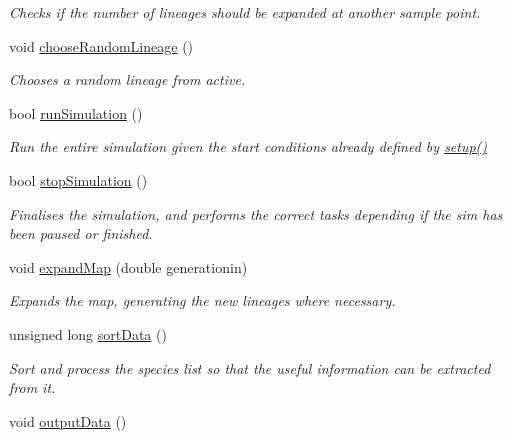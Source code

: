 \begin{DoxyCompactItemize}
\begin{DoxyCompactList}\small\item\em Checks if the number of lineages should be expanded at another sample point. \end{DoxyCompactList}\item 
void \hyperlink{class_tree_a23803bddf46ad28a1bdd46bf05693b1f}{choose\+Random\+Lineage} ()
\begin{DoxyCompactList}\small\item\em Chooses a random lineage from active. \end{DoxyCompactList}\item 
bool \hyperlink{class_tree_afe75245862a1c40030c1c8607518cf8d}{run\+Simulation} ()
\begin{DoxyCompactList}\small\item\em Run the entire simulation given the start conditions already defined by \hyperlink{class_tree_aec10ea2b720edc13a38310afdfe2b6e4}{setup()} \end{DoxyCompactList}\item 
bool \hyperlink{class_tree_afd6bd75c301d2f57c4997fcfc92f192e}{stop\+Simulation} ()
\begin{DoxyCompactList}\small\item\em Finalises the simulation, and performs the correct tasks depending if the sim has been paused or finished. \end{DoxyCompactList}\item 
void \hyperlink{class_tree_aea93074542f30a4a51c05140aae93708}{expand\+Map} (double generationin)
\begin{DoxyCompactList}\small\item\em Expands the map, generating the new lineages where necessary. \end{DoxyCompactList}\item 
unsigned long \hyperlink{class_tree_a2d2065bbebee8b55270d2691d40cd974}{sort\+Data} ()\hypertarget{class_tree_a2d2065bbebee8b55270d2691d40cd974}{}\label{class_tree_a2d2065bbebee8b55270d2691d40cd974}

\begin{DoxyCompactList}\small\item\em Sort and process the species list so that the useful information can be extracted from it. \end{DoxyCompactList}\item 
void \hyperlink{class_tree_afdf680e187c25ed39d1e66542ce44cc3}{output\+Data} ()\hypertarget{class_tree_afdf680e187c25ed39d1e66542ce44cc3}{}\label{class_tree_afdf680e187c25ed39d1e66542ce44cc3}


\end{DoxyCompactItemize}
